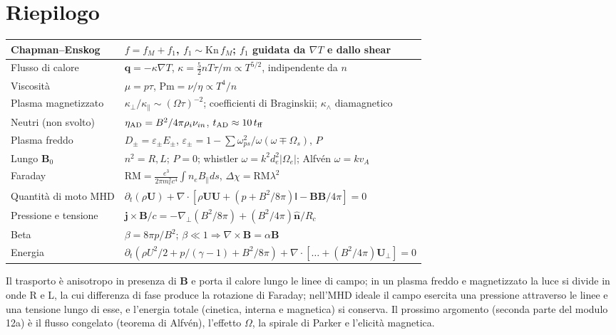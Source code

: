 \section{Riepilogo}
\begin{center}
\small
\begin{tabular}{|l|l|}
\hline
Chapman--Enskog & $f=f_M+f_1$, $f_1\sim\mathrm{Kn}\,f_M$; $f_1$ guidata da $\nabla T$ e dallo shear\\
\hline
Flusso di calore & $\mathbf{q}=-\kappa\nabla T$, $\kappa=\frac52 nT\tau/m\propto T^{5/2}$, indipendente da $n$\\
\hline
Viscosità & $\mu=p\tau$, $\mathrm{Pm}=\nu/\eta\propto T^4/n$\\
\hline
Plasma magnetizzato & $\kappa_\perp/\kappa_\parallel\sim(\Omega\tau)^{-2}$; coefficienti di Braginskii; $\kappa_\wedge$ diamagnetico\\
\hline
Neutri (non svolto) & $\eta_{\rm AD}=B^2/4\pi\rho_i\nu_{in}$, $t_{\rm AD}\approx10\,t_{\rm ff}$\\
\hline
Plasma freddo & $D_\pm=\varepsilon_\pm E_\pm$, $\varepsilon_\pm=1-\sum\omega_{ps}^2/\omega(\omega\mp\Omega_s)$, $P$\\
\hline
Lungo $\mathbf{B}_0$ & $n^2=R,L$; $P=0$; whistler $\omega=k^2d_e^2|\Omega_e|$; Alfv\'en $\omega=kv_A$\\
\hline
Faraday & $\mathrm{RM}=\frac{e^3}{2\pi m_e^2c^4}\int n_eB_\parallel ds$, $\Delta\chi=\mathrm{RM}\lambda^2$\\
\hline
Quantit\`a di moto MHD & $\partial_t(\rho\mathbf{U})+\nabla\cdot[\rho\mathbf{U}\mathbf{U}+(p+B^2/8\pi)\mathsf{I}-\mathbf{B}\mathbf{B}/4\pi]=0$\\
\hline
Pressione e tensione & $\mathbf{j}\times\mathbf{B}/c=-\nabla_\perp(B^2/8\pi)+(B^2/4\pi)\hat{\mathbf{n}}/R_c$\\
\hline
Beta & $\beta=8\pi p/B^2$; $\beta\ll1\Rightarrow\nabla\times\mathbf{B}=\alpha\mathbf{B}$\\
\hline
Energia & $\partial_t(\rho U^2/2+p/(\gamma-1)+B^2/8\pi)+\nabla\cdot[\dots+(B^2/4\pi)\mathbf{U}_\perp]=0$\\
\hline
\end{tabular}
\end{center}
Il trasporto è anisotropo in presenza di $\mathbf{B}$ e porta il calore lungo le linee di campo; in un plasma freddo e magnetizzato la luce si divide in onde R e L, la cui differenza di fase produce la rotazione di Faraday; nell'MHD ideale il campo esercita una pressione attraverso le linee e una tensione lungo di esse, e l'energia totale (cinetica, interna e magnetica) si conserva. Il prossimo argomento (seconda parte del modulo 12a) è il flusso congelato (teorema di Alfv\'en), l'effetto $\Omega$, la spirale di Parker e l'elicità magnetica.
